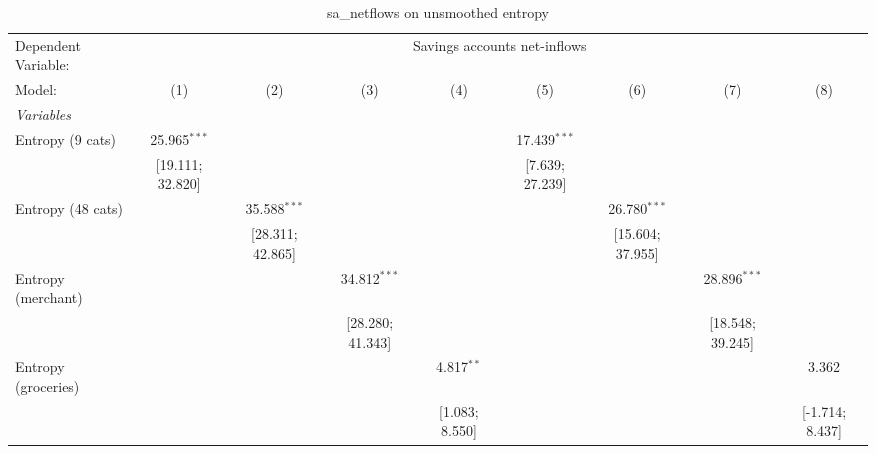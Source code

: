 
\begin{table}[htbp]
   \centering
   \tiny
   \begin{threeparttable}[b]
      \caption{\label{tab:reg_sa_netflows} sa\_netflows on unsmoothed entropy}
      \begin{tabular}{lcccccccc}
         \tabularnewline \midrule \midrule
         Dependent Variable: & \multicolumn{8}{c}{Savings accounts net-inflows}\\
         Model:                 & (1)                & (2)                & (3)                & (4)                & (5)                & (6)                & (7)                & (8)\\  
         \midrule
         \emph{Variables}\\
         Entropy (9 cats)       & 25.965$^{***}$     &                    &                    &                    & 17.439$^{***}$     &                    &                    &   \\   
                                & [19.111; 32.820]   &                    &                    &                    & [7.639; 27.239]    &                    &                    &   \\   
         Entropy (48 cats)      &                    & 35.588$^{***}$     &                    &                    &                    & 26.780$^{***}$     &                    &   \\   
                                &                    & [28.311; 42.865]   &                    &                    &                    & [15.604; 37.955]   &                    &   \\   
         Entropy (merchant)     &                    &                    & 34.812$^{***}$     &                    &                    &                    & 28.896$^{***}$     &   \\   
                                &                    &                    & [28.280; 41.343]   &                    &                    &                    & [18.548; 39.245]   &   \\   
         Entropy (groceries)    &                    &                    &                    & 4.817$^{**}$       &                    &                    &                    & 3.362\\   
                                &                    &                    &                    & [1.083; 8.550]     &                    &                    &                    & [-1.714; 8.437]\\   

\end{tabular}
\end{threeparttable}
\end{table}
